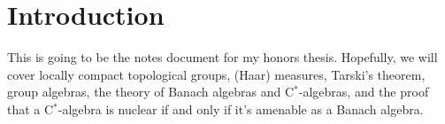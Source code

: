 \documentclass[10pt]{mypackage}
\begin{document}
\section{Introduction}%
This is going to be the notes document for my honors thesis. Hopefully, we will cover locally compact topological groups, (Haar) measures, Tarski's theorem, group algebras, the theory of Banach algebras and C$^{\ast}$-algebras, and the proof that a C$^{\ast}$-algebra is nuclear if and only if it's amenable as a Banach algebra.
\end{document}
